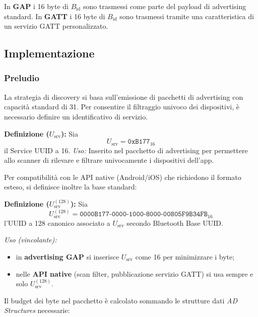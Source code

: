\documentclass[a4paper,11pt,table,dvipsnames]{article}
\begin{document}
In \textbf{GAP} i 16 byte di \(B_{\text{id}}\) sono trasmessi come parte del payload di advertising standard.
In \textbf{GATT} i 16 byte di \(B_{\text{id}}\) sono trasmessi tramite una caratteristica di un servizio GATT personalizzato.

\subsection{Implementazione}

\subsubsection{Preludio}
La strategia di discovery si basa sull'emissione di pacchetti di advertising con capacità standard di \SI{31}{\byte}. Per consentire il filtraggio univoco dei dispositivi, è necessario definire un identificativo di servizio.

\textbf{Definizione (\(U_{\text{srv}}\)):}
Sia
\[
    U_{\text{srv}} = \texttt{0xB177}_{16}
\]
il Service UUID a \SI{16}{\bit}.
\emph{Uso:} Inserito nel pacchetto di advertising per permettere allo scanner di rilevare e filtrare univocamente i dispositivi dell'app.

Per compatibilità con le API native (Android/iOS) che richiedono il formato esteso, si definisce inoltre la base standard:

\textbf{Definizione (\(U_{\text{srv}}^{(128)}\)):}
Sia
\[
    U_{\text{srv}}^{(128)} = \texttt{0000B177-0000-1000-8000-00805F9B34FB}_{16}
\]
l'UUID a \SI{128}{\bit} canonico associato a \(U_{\text{srv}}\) secondo Bluetooth Base UUID.

\emph{Uso (vincolante):}
\begin{itemize}[nosep]
    \item in \textbf{advertising GAP} si inserisce \(U_{\text{srv}}\) come \SI{16}{\bit} per minimizzare i byte;
    \item nelle \textbf{API native} (scan filter, pubblicazione servizio GATT) si usa sempre e solo \(U_{\text{srv}}^{(128)}\).
\end{itemize}

Il budget dei byte nel pacchetto è calcolato sommando le strutture dati \emph{AD Structures} necessarie:
\end{document}
